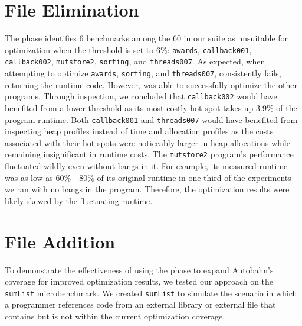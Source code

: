 
\section{\Preopt{} File Elimination}

\label{sec:file-elim}

The \preopt{} phase identifies 6 benchmarks among the 60 in our suite
as unsuitable for optimization when the \hotspotcost{}
threshold is set to 6\%:  \texttt{awards}, \texttt{callback001},
\texttt{callback002}, \texttt{mutstore2}, \texttt{sorting}, and \texttt{threads007}. As
expected, when attempting to
optimize \texttt{awards}, \texttt{sorting},
and \texttt{threads007}, \Ao{} consistently fails, returning
the \unimp{} runtime code. However, \Ao{} was able to
successfully optimize the other programs. Through inspection, we
concluded that \texttt{callback002} would have benefited from a
lower \hotspotcost{} threshold as its most costly hot spot takes up
3.9\% of the program runtime. Both \texttt{callback001}
and \texttt{threads007} would have benefited from inspecting heap
profiles instead of time and allocation profiles as the costs
associated with their hot spots were noticeably larger in heap
allocations while remaining insignificant in runtime
costs. The \texttt{mutstore2} program's performance fluctuated wildly
even without bangs in it. For example, its measured runtime was as low
as 60\% - 80\% of its original runtime in one-third of the experiments
we ran with no bangs in the program. Therefore, the optimization
results were likely skewed by the fluctuating runtime.


\section{\Preopt{} File Addition}

To demonstrate the effectiveness of using the \preopt{} phase to
expand Autobahn's coverage for improved optimization results, we
tested our approach on the \texttt{sumList} microbenchmark. We
created \texttt{sumList} to simulate the scenario in which a
programmer references code from an external library or external file
that contains \hotspots{} but is not within the current optimization
coverage.

